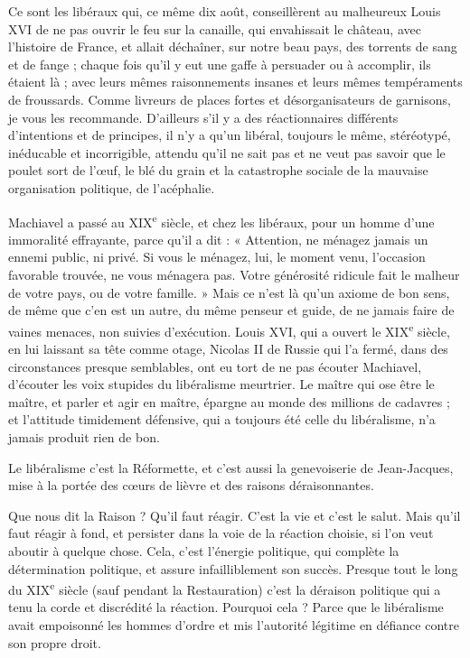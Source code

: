 \documentclass[french,twoside]{book} %
\begin{document}
Ce sont les libéraux qui, ce même dix août, conseillèrent au malheureux Louis XVI de ne pas ouvrir le feu sur la canaille, qui envahissait le château, avec l’histoire de France, et allait déchaîner, sur notre beau pays, des torrents de sang et de fange ; chaque fois qu’il y eut une gaffe à persuader ou à accomplir, ils étaient là ; avec leurs mêmes raisonnements insanes et leurs mêmes tempéraments de froussards. Comme livreurs de places fortes et désorganisateurs de garnisons, je vous les recommande. D’ailleurs s’il y a des réactionnaires différents d’intentions et de principes, il n’y a qu’un libéral, toujours le même, stéréotypé, inéducable et incorrigible, attendu qu’il ne sait pas et ne veut pas savoir que le poulet sort de l’œuf, le blé du grain et la catastrophe sociale de la mauvaise organisation politique, de l’acéphalie.\par
Machiavel a passé au XIX\textsuperscript{e} siècle, et chez les libéraux, pour un homme d’une immoralité effrayante, parce qu’il a dit : « Attention, ne ménagez jamais un ennemi public, ni privé. Si vous le ménagez, lui, le moment venu, l’occasion favorable trouvée, ne vous ménagera pas. Votre générosité ridicule fait le malheur de votre pays, ou de votre famille. » Mais ce n’est là qu’un axiome de bon sens, de même que c’en est un autre, du même penseur et guide, de ne jamais faire de vaines menaces, non suivies d’exécution. Louis XVI, qui a ouvert le XIX\textsuperscript{e} siècle, en lui laissant sa tête comme otage, Nicolas II de Russie qui l’a fermé, dans des circonstances presque semblables, ont eu tort de ne pas écouter Machiavel, d’écouter les voix stupides du libéralisme meurtrier. Le maître qui ose être le maître, et parler et agir en maître, épargne au monde des millions de cadavres ; et l’attitude timidement défensive, qui a toujours été celle du libéralisme, n’a jamais produit rien de bon.\par
Le libéralisme c’est la Réformette, et c’est aussi la genevoiserie de Jean-Jacques, mise à la portée des cœurs de lièvre et des raisons déraisonnantes.\par
Que nous dit la Raison ? Qu’il faut réagir. C’est la vie et c’est le salut. Mais qu’il faut réagir à fond, et persister dans la voie de la réaction choisie, si l’on veut aboutir à quelque chose. Cela, c’est l’énergie politique, qui complète la détermination politique, et assure infailliblement son succès. Presque tout le long du XIX\textsuperscript{e} siècle (sauf pendant la Restauration) c’est la déraison politique qui a tenu la corde et discrédité la réaction. Pourquoi cela ? Parce que le libéralisme avait empoisonné les hommes d’ordre et mis l’autorité légitime en défiance contre son propre droit.\par
\end{document}

